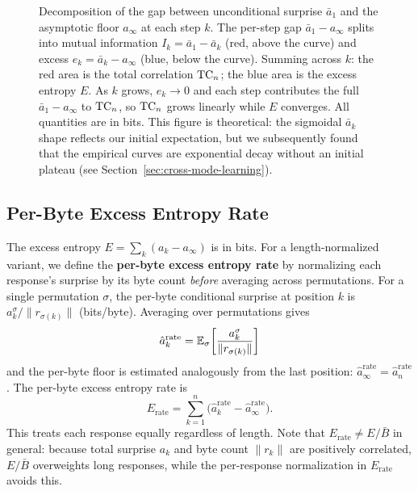 \begin{figure}[tb]
\caption{Decomposition of the gap between unconditional surprise $\bar{a}_1$ and the asymptotic floor $a_\infty$ at each step $k$.
The per-step gap $\bar{a}_1 - a_\infty$ splits into mutual information $I_k = \bar{a}_1 - \bar{a}_k$ (\textcolor{red!70}{red}, above the curve) and excess $e_k = \bar{a}_k - a_\infty$ (\textcolor{blue!70}{blue}, below the curve).
Summing across $k$: the red area is the total correlation $\mathrm{TC}_n$; the blue area is the excess entropy $E$.
As $k$ grows, $e_k \to 0$ and each step contributes the full $\bar{a}_1 - a_\infty$ to $\mathrm{TC}_n$, so $\mathrm{TC}_n$ grows linearly while $E$ converges.
All quantities are in bits.
This figure is theoretical: the sigmoidal $\bar{a}_k$ shape reflects our initial expectation, but we subsequently found that the empirical curves are exponential decay without an initial plateau (see Section~\ref{sec:cross-mode-learning}).}
\label{fig:decomposition}
\end{figure}

\subsection{Per-Byte Excess Entropy Rate}\label{app:per-byte-rate}

The excess entropy $E = \sum_k (a_k - a_\infty)$ is in bits.
For a length-normalized variant, we define the \textbf{per-byte excess entropy rate} by normalizing each response's surprise by its byte count \emph{before} averaging across permutations.
For a single permutation $\sigma$, the per-byte conditional surprise at position $k$ is $a_k^\sigma / \|r_{\sigma(k)}\|$ (bits/byte).
Averaging over permutations gives
\begin{equation}
    \hat{a}_k^{\mathrm{rate}} = \mathbb{E}_\sigma\!\left[\frac{a_k^\sigma}{\|r_{\sigma(k)}\|}\right]
\end{equation}
and the per-byte floor is estimated analogously from the last position: $\hat{a}_\infty^{\mathrm{rate}} = \hat{a}_n^{\mathrm{rate}}$.
The per-byte excess entropy rate is
\begin{equation}\label{eq:per-byte-E}
    E_{\mathrm{rate}} = \sum_{k=1}^{n}\bigl(\hat{a}_k^{\mathrm{rate}} - \hat{a}_\infty^{\mathrm{rate}}\bigr).
\end{equation}
This treats each response equally regardless of length.
Note that $E_{\mathrm{rate}} \neq E / \bar{B}$ in general: because total surprise $a_k$ and byte count $\|r_k\|$ are positively correlated, $E / \bar{B}$ overweights long responses, while the per-response normalization in $E_{\mathrm{rate}}$ avoids this.

